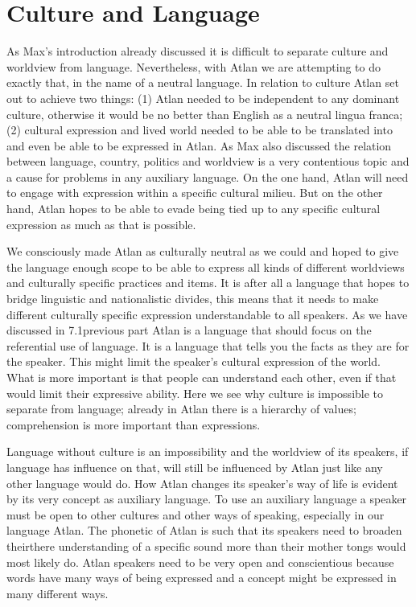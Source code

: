 \section{Culture and Language}


As Max’s introduction already discussed it is difficult to separate culture and worldview from language. Nevertheless, with Atlan we are attempting to do exactly that, in the name of a neutral language. In relation to culture Atlan set out to achieve two things: (1) Atlan needed to be independent to any dominant culture, otherwise it would be no better than English as a neutral lingua franca; (2) cultural expression and lived world needed to be able to be translated into and even be able to be expressed in Atlan. As Max also discussed the relation between language, country, politics and worldview is a very contentious topic and a cause for problems in any auxiliary language. On the one hand, Atlan will need to engage with expression within a specific cultural milieu. But on the other hand, Atlan hopes to be able to evade being tied up to any specific cultural expression as much as that is possible.				 		

We consciously made Atlan as culturally neutral as we could and hoped to give the language enough scope to be able to express all kinds of different worldviews and culturally specific practices and items. It is after all a language that hopes to bridge linguistic and nationalistic divides, this means that it needs to make different culturally specific expression understandable to all speakers. As we have discussed in 7.1previous part Atlan is a language that should focus on the referential use of language. It is a language that tells you the facts as they are for the speaker. This might limit the speaker's cultural expression of the world. What is more important is that people can understand each other, even if that would limit their expressive ability. Here we see why culture is impossible to separate from language; already in Atlan there is a hierarchy of values; comprehension is more important than expressions. 					 

Language without culture is an impossibility and the worldview of its speakers, if language has influence on that, will still be influenced by Atlan just like any other language would do. How Atlan changes its speaker's way of life is evident by its very concept as auxiliary language. To use an auxiliary language a speaker must be open to other cultures and other ways of speaking, especially in our language Atlan. The phonetic of Atlan is such that its speakers need to broaden theirthere understanding of a specific sound more than their mother tongs would most likely do. Atlan speakers need to be very open and conscientious because words have many ways of being expressed and a concept might be expressed in many different ways. 									 

